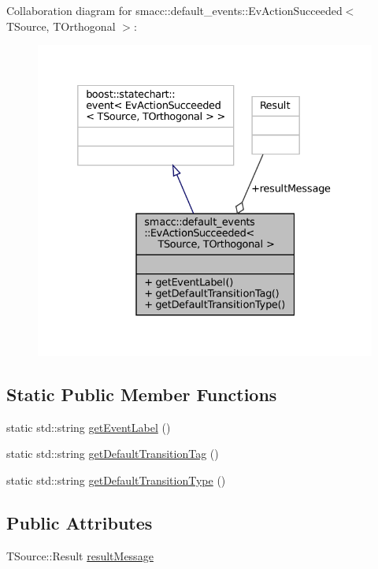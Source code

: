 Collaboration diagram for smacc\+:\+:default\+\_\+events\+:\+:Ev\+Action\+Succeeded$<$ T\+Source, T\+Orthogonal $>$\+:
\nopagebreak
\begin{figure}[H]
\begin{center}
\leavevmode
\includegraphics[width=332pt]{structsmacc_1_1default__events_1_1EvActionSucceeded__coll__graph}
\end{center}
\end{figure}
\subsection*{Static Public Member Functions}
\begin{DoxyCompactItemize}
\item 
static std\+::string \hyperlink{structsmacc_1_1default__events_1_1EvActionSucceeded_a5ff4f33c0c4a1cc704a804ff6aa2692d}{get\+Event\+Label} ()
\item 
static std\+::string \hyperlink{structsmacc_1_1default__events_1_1EvActionSucceeded_a3efa02ebbf17f0775bec92650af7ef58}{get\+Default\+Transition\+Tag} ()
\item 
static std\+::string \hyperlink{structsmacc_1_1default__events_1_1EvActionSucceeded_ac96046bba5fce1111a9410b5d02089c4}{get\+Default\+Transition\+Type} ()
\end{DoxyCompactItemize}
\subsection*{Public Attributes}
\begin{DoxyCompactItemize}
\item 
T\+Source\+::\+Result \hyperlink{structsmacc_1_1default__events_1_1EvActionSucceeded_a2b9fab646bbd6918aa9ce597363881b5}{result\+Message}
\end{DoxyCompactItemize}



